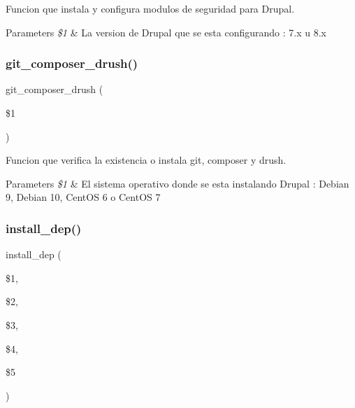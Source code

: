 Funcion que instala y configura modulos de seguridad para Drupal. 


\begin{DoxyParams}{Parameters}
{\em \$1} & La version de Drupal que se esta configurando \+: \textquotesingle{}7.\+x\textquotesingle{} u \textquotesingle{}8.\+x\textquotesingle{} \\
\hline
\end{DoxyParams}
\mbox{\label{Drupal__Instalador__General_8sh_a3cc44682ce03ae17ac41a78185920c59}} 
\subsubsection{\texorpdfstring{git\+\_\+composer\+\_\+drush()}{git\_composer\_drush()}}
{\footnotesize\ttfamily git\+\_\+composer\+\_\+drush (\begin{DoxyParamCaption}\item[{}]{\$1 }\end{DoxyParamCaption})}



Funcion que verifica la existencia o instala git, composer y drush. 


\begin{DoxyParams}{Parameters}
{\em \$1} & El sistema operativo donde se esta instalando Drupal \+: \textquotesingle{}Debian 9\textquotesingle{}, \textquotesingle{}Debian 10\textquotesingle{}, \textquotesingle{}Cent\+OS 6\textquotesingle{} o \textquotesingle{}Cent\+OS 7\textquotesingle{} \\
\hline
\end{DoxyParams}
\mbox{\label{Drupal__Instalador__General_8sh_a867cb91b69b68d903ea8d2ebcff6ea36}} 
\subsubsection{\texorpdfstring{install\+\_\+dep()}{install\_dep()}}
{\footnotesize\ttfamily install\+\_\+dep (\begin{DoxyParamCaption}\item[{}]{\$1,  }\item[{}]{\$2,  }\item[{}]{\$3,  }\item[{}]{\$4,  }\item[{}]{\$5 }\end{DoxyParamCaption})}



